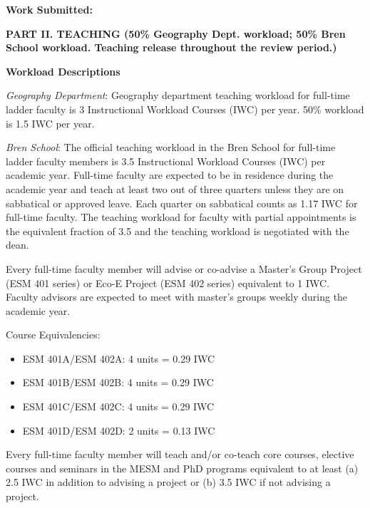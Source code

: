 \documentclass[10pt]{article}
\begin{document}
{\bf Work Submitted:}


 {\setlength{\extrarowheight}{3.5pt}

}


\vspace{1cm}
\textbf{PART II.  TEACHING (50\% Geography Dept. workload; 50\% Bren School workload. Teaching release throughout the review period.)}

\vspace{0.5cm}

\textbf{Workload Descriptions}

\begin{enumerate}
{\footnotesize

\item {\em Geography Department}: Geography department teaching workload for full-time ladder faculty is 3 Instructional Workload Courses (IWC) per year. 50\% workload is 1.5 IWC per year.

\item {\em Bren School}:  The official teaching workload in the Bren School for full-time ladder faculty members is 3.5 Instructional Workload Courses (IWC) per academic year. Full-time faculty are expected to be in residence during the academic year and teach at least two out of three quarters unless they are on sabbatical or approved leave. Each quarter on sabbatical counts as 1.17 IWC for full-time faculty. The teaching workload for faculty with partial appointments is the equivalent fraction of 3.5 and the teaching workload is negotiated with the dean.

Every full-time faculty member will advise or co-advise a Master’s Group Project (ESM 401 series) or Eco-E Project (ESM 402 series) equivalent to 1 IWC. Faculty advisors are expected to meet with master’s groups weekly during the academic year.

Course Equivalencies:
\begin{itemize}
    \item ESM 401A/ESM 402A: 4 units = 0.29 IWC 
    \item ESM 401B/ESM 402B: 4 units = 0.29 IWC
    \item ESM 401C/ESM 402C: 4 units = 0.29 IWC
    \item ESM 401D/ESM 402D: 2 units = 0.13 IWC
\end{itemize}

Every full-time faculty member will teach and/or co-teach core courses, elective courses and seminars in the MESM and PhD programs equivalent to at least (a) 2.5 IWC in addition to advising a project or (b) 3.5 IWC if not advising a project. 

}
\end{enumerate}
\end{document}
